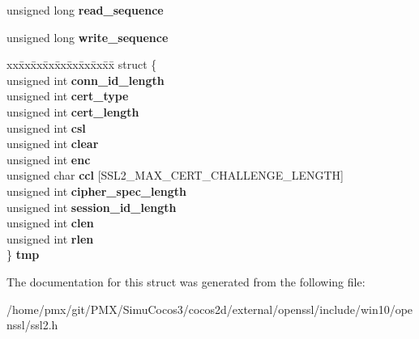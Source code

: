 \begin{DoxyCompactItemize}
\item 
\mbox{\label{structssl2__state__st_a8033b51398769bf5020d2146e8a42026}} 
unsigned long {\bfseries read\+\_\+sequence}
\item 
\mbox{\label{structssl2__state__st_a3a3f232e547d9f5edecb3bc3374fbc1a}} 
unsigned long {\bfseries write\+\_\+sequence}
\item 
\mbox{\label{structssl2__state__st_aed3c9aa5dbe9de63a5dddcfb6ecb6e70}} 
\begin{tabbing}
xx\=xx\=xx\=xx\=xx\=xx\=xx\=xx\=xx\=\kill
struct \{\\
\>unsigned int {\bfseries conn\_id\_length}\\
\>unsigned int {\bfseries cert\_type}\\
\>unsigned int {\bfseries cert\_length}\\
\>unsigned int {\bfseries csl}\\
\>unsigned int {\bfseries clear}\\
\>unsigned int {\bfseries enc}\\
\>unsigned char {\bfseries ccl} \mbox{[}SSL2\_MAX\_CERT\_CHALLENGE\_LENGTH\mbox{]}\\
\>unsigned int {\bfseries cipher\_spec\_length}\\
\>unsigned int {\bfseries session\_id\_length}\\
\>unsigned int {\bfseries clen}\\
\>unsigned int {\bfseries rlen}\\
\} {\bfseries tmp}\\

\end{tabbing}\end{DoxyCompactItemize}


The documentation for this struct was generated from the following file\+:\begin{DoxyCompactItemize}
\item 
/home/pmx/git/\+P\+M\+X/\+Simu\+Cocos3/cocos2d/external/openssl/include/win10/openssl/ssl2.\+h\end{DoxyCompactItemize}
